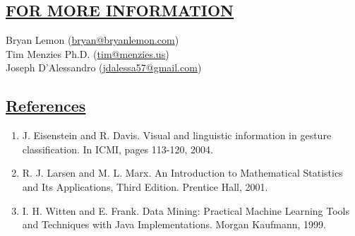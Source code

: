 \begin{kasten}
    \section*{ \hspace{0.1cm} {\color{red} \underline{FOR MORE INFORMATION}}}
    \vspace{-0.5em}
    \normalsize{
      Bryan Lemon (\url{bryan@bryanlemon.com})\\
      Tim Menzies Ph.D. (\url{tim@menzies.us})\\
      Joseph D'Alessandro (\url{jdalessa57@gmail.com})
    }
    \vspace{-0.5em}
\end{kasten}

\begin{kasten}
    \section*{ \hspace{0.1cm} {\color{red} \underline{References}}}
    \vspace{-0.5em}
    \normalsize{
      \begin{enumerate}
      \item J. Eisenstein and R. Davis. Visual and linguistic information in gesture classification. In ICMI, pages 113-120, 2004.
      \item R. J. Larsen and M. L. Marx. An Introduction to Mathematical Statistics and Its Applications, Third Edition. Prentice Hall, 2001.
      \item I. H. Witten and E. Frank. Data Mining: Practical Machine Learning Tools and Techniques with Java Implementations. Morgan Kaufmann, 1999.
      \end{enumerate}
    }
\end{kasten}
